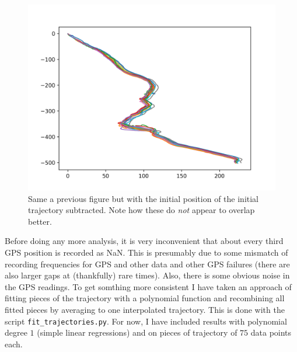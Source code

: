 \documentclass[a4]{article}
\begin{document}
\begin{figure}
  \includegraphics[width=\textwidth]{figures/cut_trajectories_samex0y0_onepanel.png}
  \caption{\label{fig:procTraj2} Same a previous figure but with the
    initial position of the initial trajectory subtracted. Note how
    these do {\em not} appear to overlap better.}
\end{figure}

Before doing any more analysis, it is very inconvenient that about
every third GPS position is recorded as NaN. This is presumably due to
some mismatch of recording frequencies for GPS and other data and
other GPS failures (there are also larger gaps at (thankfully) rare
times). Also, there is some obvious noise in the GPS readings. To get
somthing more consistent I have taken an approach of fitting pieces of
the trajectory with a polynomial function and recombining all fitted
pieces by averaging to one interpolated trajectory. This is done with the script
\verb+fit_trajectories.py+. For now, I have included results with
polynomial degree $1$ (simple linear regressions) and on pieces of
trajectory of $75$ data points each.
\end{document}
